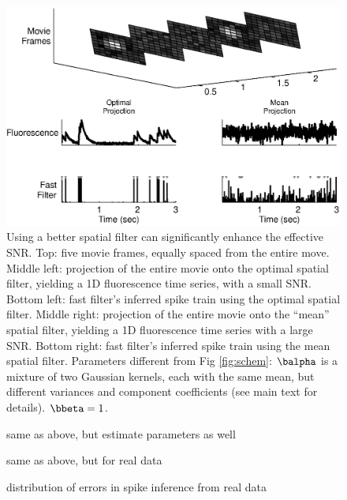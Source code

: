\begin{figure}
\centering \includegraphics[width=.9\linewidth]{spatial}
\caption{Using a better spatial filter can significantly enhance the effective SNR.  Top: five movie frames, equally spaced from the entire move.  Middle left: projection of the entire movie onto the optimal spatial filter, yielding a 1D fluorescence time series, with a small SNR. Bottom left: fast filter's inferred spike train using the optimal spatial filter.  Middle right: projection of the entire movie onto the ``mean'' spatial filter, yielding a 1D fluorescence time series with a large SNR. Bottom right: fast filter's inferred spike train using the mean spatial filter. Parameters different from Fig \ref{fig:schem}: $\balpha$ is a mixture of two Gaussian kernels, each with the same mean, but different variances and component coefficients (see main text for details). $\bbeta=1$.} \label{fig:spatial} \end{figure} 

\begin{figure}
\caption{same as above, but estimate parameters as well} \label{fig:spatial_EM}
\end{figure}

\begin{figure}
\caption{same as above, but for real data} \label{fig:spatial_data}
\end{figure}

\begin{figure}
\caption{distribution of errors in spike inference from real data} \label{fig:err}
\end{figure}

